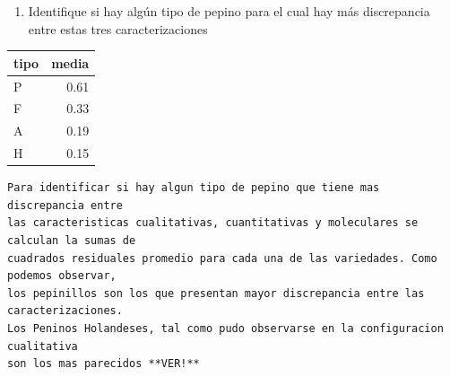 \documentclass[
]{article}
\newenvironment{Shaded}{\begin{snugshade}}{\end{snugshade}}
\newcommand{\DataTypeTok}[1]{\textcolor[rgb]{0.13,0.29,0.53}{#1}}
\newcommand{\DecValTok}[1]{\textcolor[rgb]{0.00,0.00,0.81}{#1}}
\newcommand{\KeywordTok}[1]{\textcolor[rgb]{0.13,0.29,0.53}{\textbf{#1}}}
\newcommand{\NormalTok}[1]{#1}
\newcommand{\OperatorTok}[1]{\textcolor[rgb]{0.81,0.36,0.00}{\textbf{#1}}}
\newcommand{\OtherTok}[1]{\textcolor[rgb]{0.56,0.35,0.01}{#1}}
\newcommand{\StringTok}[1]{\textcolor[rgb]{0.31,0.60,0.02}{#1}}
\providecommand{\tightlist}{%
  \setlength{\itemsep}{0pt}\setlength{\parskip}{0pt}}
\begin{document}
\begin{enumerate}
\def\labelenumi{\Alph{enumi})}
\tightlist
\item
  Identifique si hay algún tipo de pepino para el cual hay más
  discrepancia entre estas tres caracterizaciones
\end{enumerate}

\begin{Shaded}
\end{Shaded}

\begin{table}
\centering\begingroup\fontsize{12}{14}\selectfont

\begin{tabular}{l|r}
\hline
tipo & media\\
\hline
P & 0.61\\
\hline
F & 0.33\\
\hline
A & 0.19\\
\hline
H & 0.15\\
\hline
\end{tabular}
\endgroup{}
\end{table}

\begin{verbatim}
Para identificar si hay algun tipo de pepino que tiene mas discrepancia entre
las caracteristicas cualitativas, cuantitativas y moleculares se calculan la sumas de
cuadrados residuales promedio para cada una de las variedades. Como podemos observar, 
los pepinillos son los que presentan mayor discrepancia entre las caracterizaciones. 
Los Peninos Holandeses, tal como pudo observarse en la configuracion cualitativa 
son los mas parecidos **VER!**
\end{verbatim}
\end{document}

